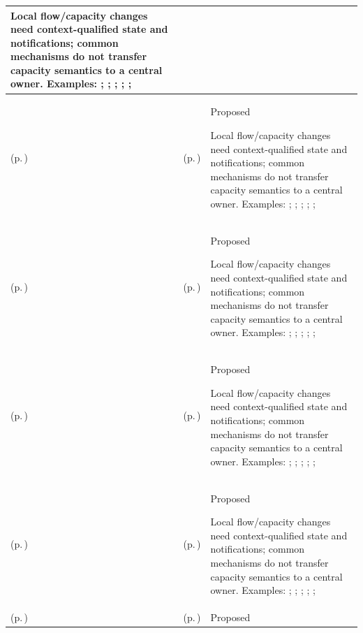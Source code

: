 \begin{longtable}{|>{\raggedright\arraybackslash}p{0.27\TableWidth}|>{\raggedright\arraybackslash}p{0.27\TableWidth}|>{\raggedright\arraybackslash}p{0.46\TableWidth}|}
Local flow/capacity changes need context-qualified state and notifications; common mechanisms do not transfer capacity semantics to a central owner. Examples: \nameref{feature:feat-hso-01}; \nameref{feature:feat-hso-02}; \nameref{function:manage-clinic-practice-capacity}; \nameref{function:track-clinic-operating-session}; \nameref{function:manage-clinic-queue-progression}; \nameref{service:clinic-queue-telemetry-service}\\\hline
\nameref{cap:bec-ward-operations} (p.\,\pageref{cap:bec-ward-operations}) & \nameref{cap:ec-02} (p.\,\pageref{cap:ec-02}) & Proposed

Local flow/capacity changes need context-qualified state and notifications; common mechanisms do not transfer capacity semantics to a central owner. Examples: \nameref{feature:feat-hso-03}; \nameref{feature:feat-hso-04}; \nameref{function:manage-ward-capacity}; \nameref{service:ward-operational-summary-query}; \nameref{function:assemble-ward-handover-context}; \nameref{feature:ward-care-capacity-management}\\\hline
\nameref{cap:bec-ward-operations} (p.\,\pageref{cap:bec-ward-operations}) & \nameref{cap:ec-03} (p.\,\pageref{cap:ec-03}) & Proposed

Local flow/capacity changes need context-qualified state and notifications; common mechanisms do not transfer capacity semantics to a central owner. Examples: \nameref{feature:feat-hso-03}; \nameref{feature:feat-hso-04}; \nameref{function:manage-ward-capacity}; \nameref{service:ward-operational-summary-query}; \nameref{function:assemble-ward-handover-context}; \nameref{feature:ward-care-capacity-management}\\\hline
\nameref{cap:bec-ward-operations} (p.\,\pageref{cap:bec-ward-operations}) & \nameref{cap:ec-09} (p.\,\pageref{cap:ec-09}) & Proposed

Local flow/capacity changes need context-qualified state and notifications; common mechanisms do not transfer capacity semantics to a central owner. Examples: \nameref{feature:feat-hso-03}; \nameref{feature:feat-hso-04}; \nameref{function:manage-ward-capacity}; \nameref{service:ward-operational-summary-query}; \nameref{function:assemble-ward-handover-context}; \nameref{feature:ward-care-capacity-management}\\\hline
\nameref{cap:bec-theatre-operations} (p.\,\pageref{cap:bec-theatre-operations}) & \nameref{cap:ec-02} (p.\,\pageref{cap:ec-02}) & Proposed

Local flow/capacity changes need context-qualified state and notifications; common mechanisms do not transfer capacity semantics to a central owner. Examples: \nameref{feature:feat-hso-05}; \nameref{feature:feat-hso-06}; \nameref{function:manage-theatre-capacity}; \nameref{function:manage-theatre-case-progression}; \nameref{service:theatre-case-progression-telemetry}; \nameref{feature:theatre-session-capacity-management}\\\hline
\nameref{cap:bec-theatre-operations} (p.\,\pageref{cap:bec-theatre-operations}) & \nameref{cap:ec-03} (p.\,\pageref{cap:ec-03}) & Proposed


\end{longtable}
